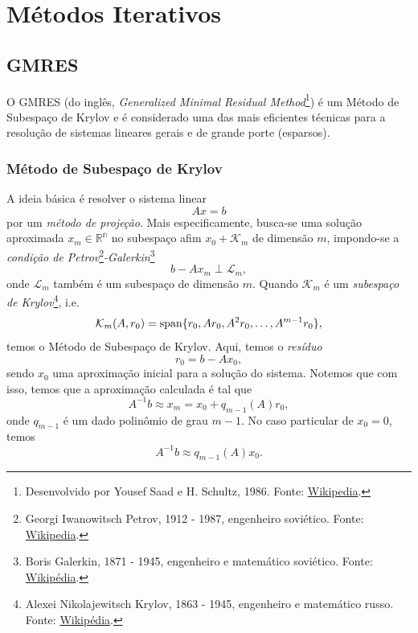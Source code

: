 \section{Métodos Iterativos}\label{cap_sislin_sec_metiter}

\subsection{GMRES}

O GMRES (do inglês, {\it Generalized Minimal Residual Method}\footnote{Desenvolvido por Yousef Saad e H. Schultz, 1986. Fonte: \href{https://en.wikipedia.org/wiki/Generalized_minimal_residual_method}{Wikipedia}.}) é um Método de Subespaço de Krylov e é considerado uma das mais eficientes técnicas para a resolução de sistemas lineares gerais e de grande porte (esparsos).

\subsubsection{Método de Subespaço de Krylov}

A ideia básica é resolver o sistema linear
\begin{equation}
  Ax = b
\end{equation}
por um \emph{método de projeção}. Mais especificamente, busca-se uma solução aproximada $x_m\in\mathbb{R^n}$ no subespaço afim $x_0 + \mathcal{K}_m$ de dimensão $m$, impondo-se a \emph{condição de Petrov}\footnote{Georgi Iwanowitsch Petrov, 1912 - 1987, engenheiro soviético. Fonte: \href{https://de.wikipedia.org/wiki/Georgi_Iwanowitsch_Petrow}{Wikipedia}.}\emph{-Galerkin}\footnote{Boris Galerkin, 1871 - 1945, engenheiro e matemático soviético. Fonte: \href{https://pt.wikipedia.org/wiki/Boris_Galerkin}{Wikipédia}.}
\begin{equation}
  b - Ax_m \perp \mathcal{L}_m,
\end{equation}
onde $\mathcal{L}_m$ também é um subespaço de dimensão $m$. Quando $\mathcal{K}_m$ é um \emph{subespaço de Krylov}\footnote{Alexei Nikolajewitsch Krylov, 1863 - 1945, engenheiro e matemático russo. Fonte: \href{https://pt.wikipedia.org/wiki/Alexei_Krylov}{Wikipédia}.}, i.e.
\begin{equation}
  \mathcal{K}_m(A,r_0) = \operatorname{span}\{r_0, Ar_0, A^2r_0,\dotsc,A^{m-1}r_0\},
\end{equation}
temos o Método de Subespaço de Krylov. Aqui, temos o \emph{resíduo}
\begin{equation}
  r_0 = b - Ax_0,
\end{equation}
sendo $x_0$ uma aproximação inicial para a solução do sistema. Notemos que com isso, temos que a aproximação calculada é tal que
\begin{equation}
  A^{-1}b \approx x_m = x_0 + q_{m-1}(A)r_0,
\end{equation}
onde $q_{m-1}$ é um dado polinômio de grau $m-1$. No caso particular de $x_0 = 0$, temos
\begin{equation}
  A^{-1}b \approx q_{m-1}(A)x_0.
\end{equation}

